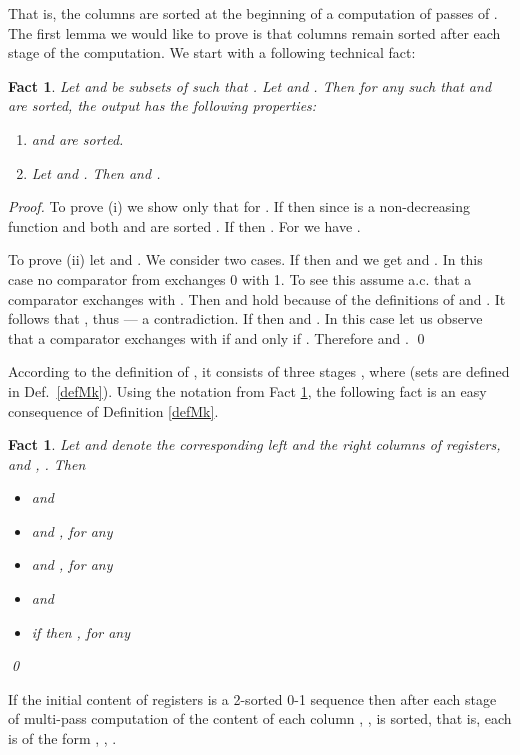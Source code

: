 \documentclass{llncs}
\newtheorem{fact}[theorem]{Fact}
\begin{document}
That is, the columns are sorted at the beginning of a computation of
 passes of . The first lemma we would like to prove is that
columns remain sorted after each stage of the computation. We start
with a following technical fact:

\begin{fact}\label{f33}
Let  and  be subsets of
 such that . Let  and . Then for any  such that  and 
are sorted, the output  has the following properties:
\begin{enumerate}
\item[(i)]  and  are sorted.
\item[(ii)] Let  and . Then  and .
\end{enumerate}
\end{fact}
\begin{proof}
To prove (i) we show only that  for
. If  then  since  is a non-decreasing function and both 
and  are sorted . If  then . For 
we have .

To prove (ii) let  and .
We consider two cases. If  then  and we
get  and . In this case no comparator from
 exchanges 0 with 1. To see this assume a.c. that a
comparator  exchanges  with
. Then  and  hold because of the
definitions of  and . It follows that ,
thus  --- a contradiction. If  then  and . In this case let us observe that a comparator
 exchanges  with  if and only
if . Therefore  and . \qed
\end{proof}
According to the definition of , it consists of three stages , where  (sets  are defined in Def.~\ref{defMk}). 
Using the notation from Fact \ref{f33}, the following fact is an easy
consequence of Definition \ref{defMk}.
\begin{fact}\label{f34} Let  and  denote the
  corresponding left and the right columns of registers, and
  , . Then
\begin{itemize}
\item[(i)]  and 
\item[(ii)]  and
  , for any 
\item[(iii)]  and , for any
  
\item[(iv)]  and
  
\item[(v)] if  then , for any 
\end{itemize} \qed
\end{fact}
\begin{lemma} \label{l35} If the initial content of registers is a
  2-sorted 0-1 sequence  then after each stage of multi-pass
  computation of  the content of each column ,
  , is sorted, that is, each  is of
  the form , , .
\end{lemma}
\end{document}
